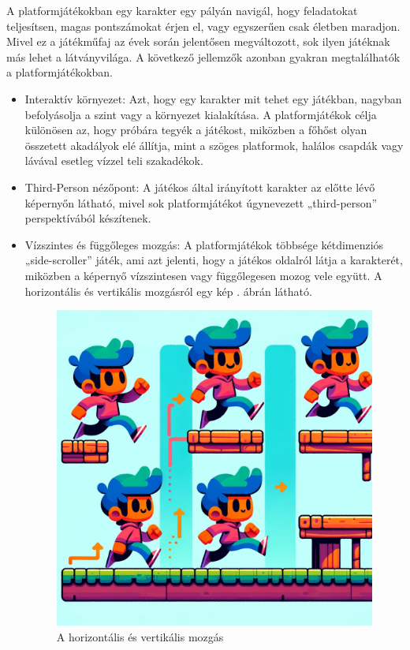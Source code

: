 A platformjátékokban egy karakter egy pályán navigál, hogy feladatokat teljesítsen, magas pontszámokat érjen el, vagy egyszerűen csak életben maradjon. Mivel ez a játékműfaj az évek során jelentősen megváltozott, sok ilyen játéknak más lehet a látványvilága. A következő jellemzők azonban gyakran megtalálhatók a platformjátékokban.\cite{platformerfeature}
\begin{itemize}
\item Interaktív környezet: Azt, hogy egy karakter mit tehet egy játékban, nagyban befolyásolja a szint vagy a környezet kialakítása. A platformjátékok célja különösen az, hogy próbára tegyék a játékost, miközben a főhőst olyan összetett akadályok elé állítja, mint a szöges platformok, halálos csapdák vagy lávával esetleg vízzel teli szakadékok.
\item Third-Person nézőpont: A játékos által irányított karakter az előtte lévő képernyőn látható, mivel sok platformjátékot úgynevezett „third-person” perspektívából készítenek.
\item Vízszintes és függőleges mozgás: A platformjátékok többsége kétdimenziós „side-scroller” játék, ami azt jelenti, hogy a játékos oldalról látja a karakterét, miközben a képernyő vízszintesen vagy függőlegesen mozog vele együtt. A horizontális és vertikális mozgásról egy kép . ábrán látható.

\begin{figure}[ht]
\centering
\includegraphics[scale = 0.28]{images/vertical_and_horizontal_movement.jpg}
\caption{A horizontális és vertikális mozgás}
\label{fig:horvermovement}
\end{figure}


\end{itemize}
